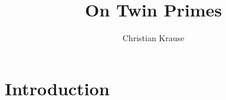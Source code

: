 \documentclass[a4paper,11pt]{article}
\title{On Twin Primes}
\author{Christian Krause}
\begin{document}
\maketitle


\section{Introduction}
\end{document}
